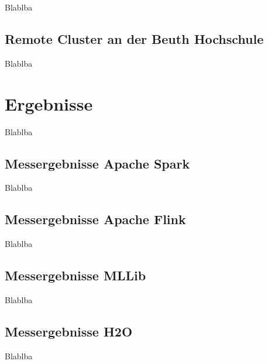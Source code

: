 Blablba

\subsection{Remote Cluster an der Beuth Hochschule}
\label{section:remote}

Blablba

\section{Ergebnisse}
\label{section:ergebnisse}

Blablba

\subsection{Messergebnisse Apache Spark}
\label{section:spark eval}

Blablba

\subsection{Messergebnisse Apache Flink}
\label{section:mllib arch}

Blablba

\subsection{Messergebnisse MLLib}
\label{section:mllib arch}

Blablba

\subsection{Messergebnisse H2O}
\label{section:mllib arch}

Blablba


